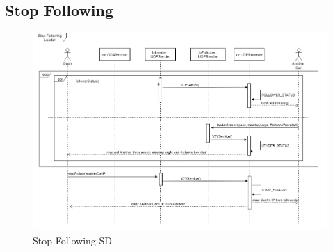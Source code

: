 \documentclass[12pt]{article}
\begin{document}
\subsection{Stop Following}
\begin{figure}[ht!]
\centering
\includegraphics[width=\linewidth]{Diagrams/StopFollowing.png}
\caption{Stop Following SD}
\label{fig:stopfollowing}
\end{figure}
\pagebreak
\end{document}
